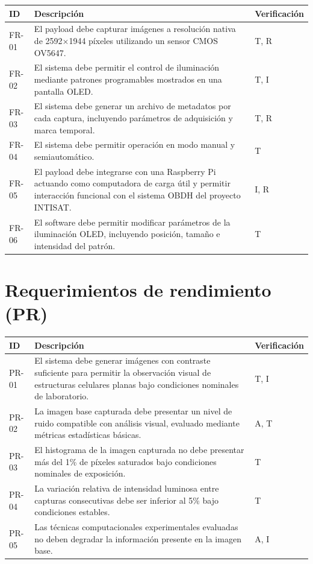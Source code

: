 \setlength{\LTpre}{0.5\baselineskip}
\setlength{\LTpost}{0.5\baselineskip}
\renewcommand{\arraystretch}{1.3}
\begin{longtable}{p{1.2cm} p{10.3cm} p{2.5cm}}
\toprule
\textbf{ID} & \textbf{Descripción} & \textbf{Verificación} \\
\midrule
FR-01 & El payload debe capturar imágenes a resolución nativa de
2592$\times$1944 píxeles utilizando un sensor CMOS OV5647. & T, R \\
FR-02 & El sistema debe permitir el control de iluminación mediante patrones
programables mostrados en una pantalla OLED. & T, I \\
FR-03 & El sistema debe generar un archivo de metadatos por cada captura,
incluyendo parámetros de adquisición y marca temporal. & T, R \\
FR-04 & El sistema debe permitir operación en modo manual y semiautomático. & T \\
FR-05 & El payload debe integrarse con una Raspberry Pi actuando como
computadora de carga útil y permitir interacción funcional con el sistema OBDH
del proyecto INTISAT. & I, R \\
FR-06 & El software debe permitir modificar parámetros de la iluminación OLED,
incluyendo posición, tamaño e intensidad del patrón. & T \\
\bottomrule
\end{longtable}
\renewcommand{\arraystretch}{1}

\section{Requerimientos de rendimiento (PR)}
\renewcommand{\arraystretch}{1.3}

\begin{longtable}{p{1.2cm} p{10.3cm} p{2.5cm}}
\toprule
\textbf{ID} & \textbf{Descripción} & \textbf{Verificación} \\
\midrule
PR-01 & El sistema debe generar imágenes con contraste suficiente para permitir
la observación visual de estructuras celulares planas bajo condiciones nominales
de laboratorio. & T, I \\
PR-02 & La imagen base capturada debe presentar un nivel de ruido compatible con
análisis visual, evaluado mediante métricas estadísticas básicas. & A, T \\
PR-03 & El histograma de la imagen capturada no debe presentar más del 1\% de
píxeles saturados bajo condiciones nominales de exposición. & T \\
PR-04 & La variación relativa de intensidad luminosa entre capturas consecutivas
debe ser inferior al 5\% bajo condiciones estables. & T \\
PR-05 & Las técnicas computacionales experimentales evaluadas no deben degradar
la información presente en la imagen base. & A, I \\
\bottomrule
\end{longtable}
\renewcommand{\arraystretch}{1}

